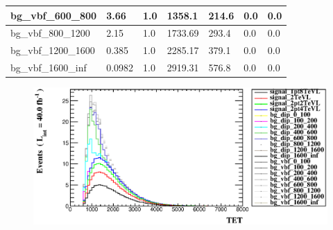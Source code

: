 \documentclass[a4paper, 10pt]{article}
\begin{document}
\begin{table}[H]
\begin{center}
\begin{tabular}{|m{23.0mm}|m{23.0mm}|m{18.0mm}|m{19.0mm}|m{19.0mm}|m{19.0mm}|m{19.0mm}|}
      \hline
      {\cellcolor{white}         bg\_vbf\_600\_800}& {\cellcolor{white}         3.66}& {\cellcolor{white}         1.0}& {\cellcolor{white}         1358.1}& {\cellcolor{white}         214.6}& {\cellcolor{green}         0.0}& {\cellcolor{green}         0.0}\\
      \hline
      {\cellcolor{white}         bg\_vbf\_800\_1200}& {\cellcolor{white}         2.15}& {\cellcolor{white}         1.0}& {\cellcolor{white}         1733.69}& {\cellcolor{white}         293.4}& {\cellcolor{green}         0.0}& {\cellcolor{green}         0.0}\\
      \hline
      {\cellcolor{white}         bg\_vbf\_1200\_1600}& {\cellcolor{white}         0.385}& {\cellcolor{white}         1.0}& {\cellcolor{white}         2285.17}& {\cellcolor{white}         379.1}& {\cellcolor{green}         0.0}& {\cellcolor{green}         0.0}\\
      \hline
      {\cellcolor{white}         bg\_vbf\_1600\_inf}& {\cellcolor{white}         0.0982}& {\cellcolor{white}         1.0}& {\cellcolor{white}         2919.31}& {\cellcolor{white}         576.8}& {\cellcolor{green}         0.0}& {\cellcolor{green}         0.0}\\
\hline
    \end{tabular}
  \end{center}
\end{table}

\begin{figure}[H]
  \begin{center}
    \includegraphics[scale=0.45]{selection_14.eps}\\
\caption{   }
  \end{center}
\end{figure}
\newpage
\end{document}
